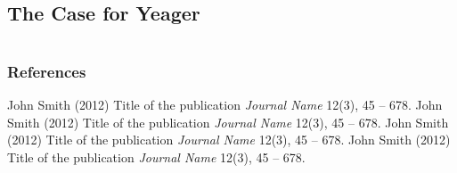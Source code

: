 \documentclass{beamer}
\begin{document}
\subsection{The Case for Yeager}

\section{}

\begin{frame}
\frametitle{References}
\footnotesize{
\begin{thebibliography}{99} %
 John Smith (2012)
\newblock Title of the publication
\newblock \emph{Journal Name} 12(3), 45 -- 678.
 John Smith (2012)
\newblock Title of the publication
\newblock \emph{Journal Name} 12(3), 45 -- 678.
 John Smith (2012)
\newblock Title of the publication
\newblock \emph{Journal Name} 12(3), 45 -- 678.
 John Smith (2012)
\newblock Title of the publication
\newblock \emph{Journal Name} 12(3), 45 -- 678.
\end{thebibliography}
}
\end{frame}
\end{document}
